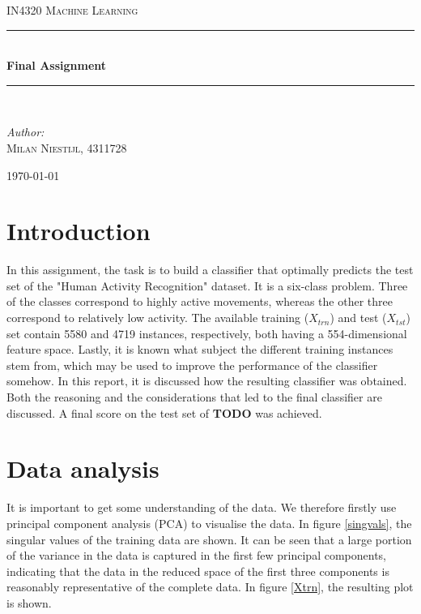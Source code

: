 \documentclass [a4paper] {report}
\begin{document}
	
	\begin{titlepage}
		\begin{center}
			
			\textsc{\LARGE IN4320 Machine Learning}\\[1.25cm]
			
			\rule{\linewidth}{0.5mm}\\[1.0cm]
			{\huge \bfseries Final Assignment }\\[0.6cm]
			\rule{\linewidth}{0.5mm}\\[1.5cm]
			
			\begin{minipage}{0.4\textwidth}
				\begin{flushleft} \large	
					\emph{Author:}\\
					\textsc{Milan Niestijl, 4311728}
				\end{flushleft}
			\end{minipage}
			
			\vfill
			{\large \today}
		\end{center}
	\end{titlepage}
	
	\section*{Introduction}
	In this assignment, the task is to build a classifier that optimally predicts the test set of the "Human Activity Recognition" dataset. It is a six-class problem. Three of the classes correspond to highly active movements, whereas the other three correspond to relatively low activity. The available training ($X_{trn}$) and test ($X_{tst}$) set contain 5580 and 4719 instances, respectively, both having a 554-dimensional feature space. Lastly, it is known what subject the different training instances stem from, which may be used to improve the performance of the classifier somehow. In this report, it is discussed how the resulting classifier was obtained. Both the reasoning and the considerations that led to the final classifier are discussed. A final score on the test set of \textbf{TODO} was achieved.
	
	\section*{Data analysis}
	It is important to get some understanding of the data. We therefore firstly use principal component analysis (PCA) to visualise the data. In figure \ref{singvals}, the singular values of the training data are shown. It can be seen that a large portion of the variance in the data is captured in the first few principal components, indicating that the data in the reduced space of the first three components is reasonably representative of the complete data. In figure \ref{Xtrn}, the resulting plot is shown. 
	
\end{document}
